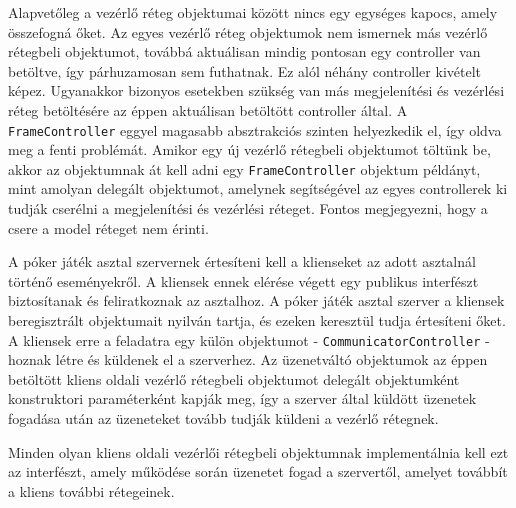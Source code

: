 Alapvetőleg a vezérlő réteg objektumai között nincs egy egységes kapocs, amely összefogná őket. Az egyes vezérlő réteg objektumok nem ismernek más vezérlő rétegbeli objektumot, továbbá aktuálisan mindig pontosan egy controller van betöltve, így párhuzamosan sem futhatnak. Ez alól néhány controller kivételt képez. Ugyanakkor bizonyos esetekben szükség van más megjelenítési és vezérlési réteg betöltésére az éppen aktuálisan betöltött controller által. A \texttt{FrameController} eggyel magasabb absztrakciós szinten helyezkedik el, így oldva meg a fenti problémát. Amikor egy új vezérlő rétegbeli objektumot töltünk be, akkor az objektumnak át kell adni egy \texttt{FrameController} objektum példányt, mint amolyan delegált objektumot, amelynek segítségével az egyes controllerek ki tudják cserélni a megjelenítési és vezérlési réteget. Fontos megjegyezni, hogy a csere a model réteget nem érinti.

A póker játék asztal szervernek értesíteni kell a klienseket az adott asztalnál történő eseményekről. A kliensek ennek elérése végett egy publikus interfészt biztosítanak és feliratkoznak az asztalhoz. A póker játék asztal szerver a kliensek beregisztrált objektumait nyilván tartja, és ezeken keresztül tudja értesíteni őket. A kliensek erre a feladatra egy külön objektumot - \texttt{CommunicatorController} - hoznak létre és küldenek el a szerverhez. Az üzenetváltó objektumok az éppen betöltött kliens oldali vezérlő rétegbeli objektumot delegált objektumként konstruktori paraméterként kapják meg, így a szerver által küldött üzenetek fogadása után az üzeneteket tovább tudják küldeni a vezérlő rétegnek.

Minden olyan kliens oldali vezérlői rétegbeli objektumnak implementálnia kell ezt az interfészt, amely működése során üzenetet fogad a szervertől, amelyet továbbít a kliens további rétegeinek.

